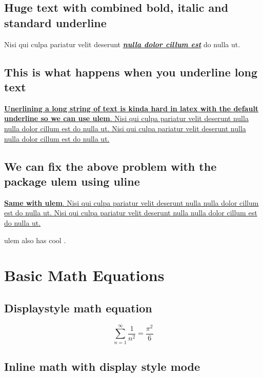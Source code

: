 \documentclass[12pt]{article}
\begin{document}
\subsection{Huge text with combined bold, italic and standard underline}
{\Huge \indent Nisi qui culpa pariatur velit deserunt \underline{\textbf{\textit{nulla dolor cillum est}}} do nulla ut.} \\

\subsection{This is what happens when you underline long text}
\underline{\textbf{Unerlining a long string of text is kinda hard in latex with the default underline so we can use ulem}. Nisi qui culpa pariatur velit deserunt nulla nulla dolor cillum est do nulla ut. Nisi qui culpa pariatur velit deserunt nulla nulla dolor cillum est do nulla ut.} \\

\subsection{We can fix the above problem with the package ulem using uline}
\uline{\textbf{Same with ulem}. Nisi qui culpa pariatur velit deserunt nulla nulla dolor cillum est do nulla ut. Nisi qui culpa pariatur velit deserunt nulla nulla dolor cillum est do nulla ut.}

{\large \noindent ulem also has  cool .}



\section{Basic Math Equations}

\subsection{Displaystyle math equation}

\begin{equation} %
    \sum_{n=1}^\infty \frac{1}{n^2} = \frac{\pi^2}{6}
\end{equation}

\subsection{Inline math with display style mode}
\end{document}
